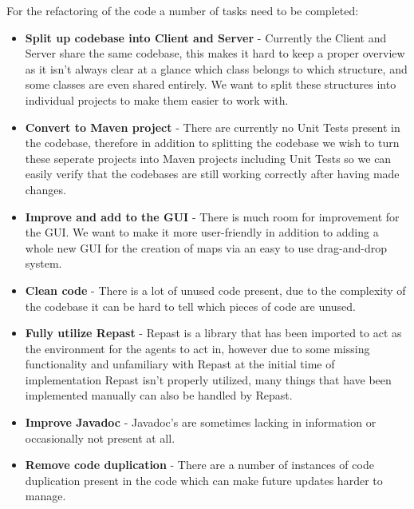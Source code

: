 For the refactoring of the code a number of tasks need to be completed:
\begin{itemize}
\item
\textbf{Split up codebase into Client and Server} - Currently the Client and Server share the same codebase, this makes it hard to keep a proper overview as it isn't always clear at a glance which class belongs to which structure, and some classes are even shared entirely. We want to split these structures into individual projects to make them easier to work with.
\item
\textbf{Convert to Maven project} - There are currently no Unit Tests present in the codebase, therefore in addition to splitting the codebase we wish to turn these seperate projects into Maven projects including Unit Tests so we can easily verify that the codebases are still working correctly after having made changes.
\item
\textbf{Improve and add to the GUI} - There is much room for improvement for the GUI. We want to make it more user-friendly in addition to adding a whole new GUI for the creation of maps via an easy to use drag-and-drop system.
\item
\textbf{Clean code} - There is a lot of unused code present, due to the complexity of the codebase it can be hard to tell which pieces of code are unused.
\item
\textbf{Fully utilize Repast} - Repast is a library that has been imported to act as the environment for the agents to act in, however due to some missing functionality and unfamiliary with Repast at the initial time of implementation Repast isn't properly utilized, many things that have been implemented manually can also be handled by Repast.
\item
\textbf{Improve Javadoc} - Javadoc's are sometimes lacking in information or occasionally not present at all.
\item
\textbf{Remove code duplication} - There are a number of instances of code duplication present in the code which can make future updates harder to manage.
\end{itemize}
